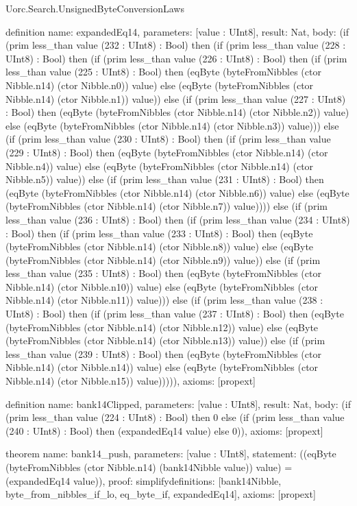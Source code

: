 \begin{lexlean}{Uorc.Search.UnsignedByteConversionLaws}
\begin{semanticmodule}
definition{
  name: expandedEq14,
  parameters: [value : UInt8],
  result: Nat,
  body: (if (prim less_than value (232 : UInt8) : Bool) then (if (prim less_than value (228 : UInt8) : Bool) then (if (prim less_than value (226 : UInt8) : Bool) then (if (prim less_than value (225 : UInt8) : Bool) then (eqByte (byteFromNibbles (ctor Nibble.n14) (ctor Nibble.n0)) value) else (eqByte (byteFromNibbles (ctor Nibble.n14) (ctor Nibble.n1)) value)) else (if (prim less_than value (227 : UInt8) : Bool) then (eqByte (byteFromNibbles (ctor Nibble.n14) (ctor Nibble.n2)) value) else (eqByte (byteFromNibbles (ctor Nibble.n14) (ctor Nibble.n3)) value))) else (if (prim less_than value (230 : UInt8) : Bool) then (if (prim less_than value (229 : UInt8) : Bool) then (eqByte (byteFromNibbles (ctor Nibble.n14) (ctor Nibble.n4)) value) else (eqByte (byteFromNibbles (ctor Nibble.n14) (ctor Nibble.n5)) value)) else (if (prim less_than value (231 : UInt8) : Bool) then (eqByte (byteFromNibbles (ctor Nibble.n14) (ctor Nibble.n6)) value) else (eqByte (byteFromNibbles (ctor Nibble.n14) (ctor Nibble.n7)) value)))) else (if (prim less_than value (236 : UInt8) : Bool) then (if (prim less_than value (234 : UInt8) : Bool) then (if (prim less_than value (233 : UInt8) : Bool) then (eqByte (byteFromNibbles (ctor Nibble.n14) (ctor Nibble.n8)) value) else (eqByte (byteFromNibbles (ctor Nibble.n14) (ctor Nibble.n9)) value)) else (if (prim less_than value (235 : UInt8) : Bool) then (eqByte (byteFromNibbles (ctor Nibble.n14) (ctor Nibble.n10)) value) else (eqByte (byteFromNibbles (ctor Nibble.n14) (ctor Nibble.n11)) value))) else (if (prim less_than value (238 : UInt8) : Bool) then (if (prim less_than value (237 : UInt8) : Bool) then (eqByte (byteFromNibbles (ctor Nibble.n14) (ctor Nibble.n12)) value) else (eqByte (byteFromNibbles (ctor Nibble.n14) (ctor Nibble.n13)) value)) else (if (prim less_than value (239 : UInt8) : Bool) then (eqByte (byteFromNibbles (ctor Nibble.n14) (ctor Nibble.n14)) value) else (eqByte (byteFromNibbles (ctor Nibble.n14) (ctor Nibble.n15)) value))))),
  axioms: [propext]
}

definition{
  name: bank14Clipped,
  parameters: [value : UInt8],
  result: Nat,
  body: (if (prim less_than value (224 : UInt8) : Bool) then 0 else (if (prim less_than value (240 : UInt8) : Bool) then (expandedEq14 value) else 0)),
  axioms: [propext]
}

theorem{
  name: bank14_push,
  parameters: [value : UInt8],
  statement: ((eqByte (byteFromNibbles (ctor Nibble.n14) (bank14Nibble value)) value) = (expandedEq14 value)),
  proof: simplify{definitions: [bank14Nibble, byte_from_nibbles_if_lo, eq_byte_if, expandedEq14]},
  axioms: [propext]
}


\end{semanticmodule}
\end{lexlean}
